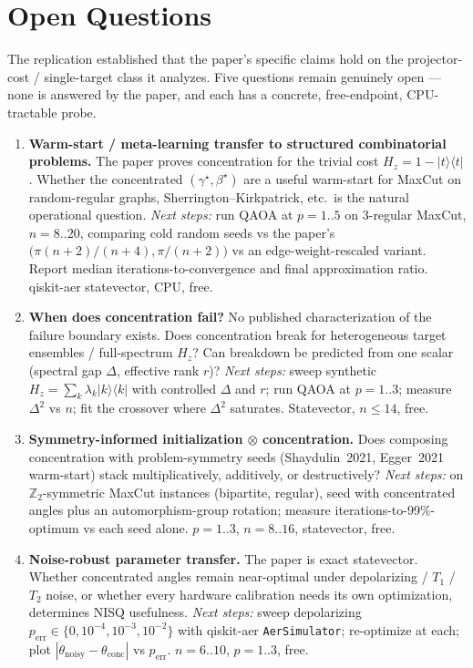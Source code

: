 \section{Open Questions}
\label{sec:open-questions}

The replication established that the paper's specific claims hold on the
projector-cost / single-target class it analyzes. Five questions remain
genuinely open --- none is answered by the paper, and each has a concrete,
free-endpoint, CPU-tractable probe.

\begin{enumerate}
\item \textbf{Warm-start / meta-learning transfer to structured combinatorial
problems.} The paper proves concentration for the trivial cost
$H_{z}=1-|t\rangle\langle t|$. Whether the concentrated
$(\gamma^{\star},\beta^{\star})$ are a useful warm-start for MaxCut on
random-regular graphs, Sherrington--Kirkpatrick, etc.\ is the natural
operational question. \emph{Next steps:} run QAOA at $p=1..5$ on 3-regular
MaxCut, $n=8..20$, comparing cold random seeds vs the paper's
$\bigl(\pi(n+2)/(n+4),\pi/(n+2)\bigr)$ vs an edge-weight-rescaled variant.
Report median iterations-to-convergence and final approximation ratio.
qiskit-aer statevector, CPU, free.

\item \textbf{When does concentration fail?} No published characterization
of the failure boundary exists. Does concentration break for heterogeneous
target ensembles / full-spectrum $H_{z}$? Can breakdown be predicted from
one scalar (spectral gap $\Delta$, effective rank $r$)? \emph{Next steps:}
sweep synthetic $H_{z}=\sum_{k}\lambda_{k}|k\rangle\langle k|$ with
controlled $\Delta$ and $r$; run QAOA at $p=1..3$; measure $\Delta^{2}$
vs $n$; fit the crossover where $\Delta^{2}$ saturates. Statevector,
$n\le14$, free.

\item \textbf{Symmetry-informed initialization $\otimes$ concentration.}
Does composing concentration with problem-symmetry seeds (Shaydulin~2021,
Egger~2021 warm-start) stack multiplicatively, additively, or destructively?
\emph{Next steps:} on $\mathbb{Z}_{2}$-symmetric MaxCut instances (bipartite,
regular), seed with concentrated angles plus an automorphism-group rotation;
measure iterations-to-99\%-optimum vs each seed alone. $p=1..3$, $n=8..16$,
statevector, free.

\item \textbf{Noise-robust parameter transfer.} The paper is exact statevector.
Whether concentrated angles remain near-optimal under depolarizing / $T_{1}$
/ $T_{2}$ noise, or whether every hardware calibration needs its own
optimization, determines NISQ usefulness. \emph{Next steps:} sweep depolarizing
$p_{\text{err}} \in \{0, 10^{-4}, 10^{-3}, 10^{-2}\}$ with qiskit-aer
\texttt{AerSimulator}; re-optimize at each; plot
$|\theta_{\text{noisy}} - \theta_{\text{conc}}|$ vs $p_{\text{err}}$.
$n=6..10$, $p=1..3$, free.


\end{enumerate}
